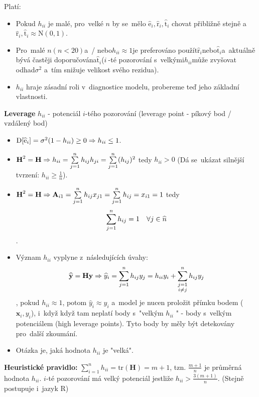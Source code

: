 \begin{remark}
Platí:
\begin{itemize}
\item Pokud $h_{ii}$ je malé, pro~velké $n$ by se~mělo $\widehat{\text{e}}_i, \widehat{\text{r}}_i, \widehat{\mathrm{t}}_i$ chovat přibližně stejně a~$\widehat{\text{r}}_i,\widehat{\mathrm{t}}_i \approx \text{N} (0, 1)$.
\item Pro~malé $n$$ (n < 20) $a~/ nebo$ h_{ii} \approx 1 $je preferováno použít$ \widehat{\text{r}}_i $nebo$ \widehat{\mathrm{t}}_i $a~aktuálně bývá častěji doporučována$ \widehat{\mathrm{t}}_i $($ i~$-té pozorování s~velkými$ h_{ii} $může zvyšovat odhad$ \sigma^2 $ a~tím snižuje velikost svého rezidua).
\item $h_{ii}$ hraje zásadní roli v~diagnostice modelu, probereme teď jeho základní vlastnosti.
\end{itemize}
\end{remark}

\textbf{Leverage} $h_{ii}$ - potenciál $i$-tého pozorování (leverage point - píkový bod / vzdálený bod)

\begin{itemize}
\item $\mathrm{D} [\widehat{\text{e}}_i] = \sigma^2 (1 - h_{ii}) \geq 0 \Rightarrow h_{ii} \leq 1$.
\item $\textbf{H}^2 = \textbf{H} \Rightarrow h_{ii} = \sum\limits_{j=1}^{n} h_{ij} h_{ji} = \sum\limits_{j=1}^{n} (h_{ij})^2$ tedy $h_{ii} > 0$ (Dá se~ukázat silnější tvrzení: $h_{ii} \geq \frac{1}{n}$).
\item $\textbf{H}^2 = \textbf{H} \Rightarrow \textbf{A}_{i1} = \sum\limits_{j=1}^{n} h_{ij} x_{j1} = \sum\limits_{j=1}^{n} h_{ij} = x_{i1} = 1$ tedy
 $$ \sum\limits_{j=1}^{n} h_{ij} = 1 \quad \forall j \in \widehat{n} $$.
\item Význam $h_{ii}$ vyplyne z~následujících úvahy:
 $$
 \widehat{\textbf{y}} = \textbf{Hy} \Rightarrow \widehat{y}_i = \sum\limits_{j=1}^{n} h_{ij}y_j = h_{ii} y_i + \sum\limits_{\substack{j = 1 \\ i\neq j}}^n h_{ij} y_j
 $$
, pokud $h_{ii} \approx 1$, potom $\widehat{y}_i \approx y_i$ a~model je nucen proložit přímku bodem ($\textbf{x}_i, y_i$), i~když když tam neplatí body s~"velkým $h_{ii}$ " - body s~velkým potenciálem (high leverage points). Tyto body by měly být detekovány pro~další zkoumání.
 \item Otázka je, jaká hodnota $h_{ii}$ je "velká".
\end{itemize}
\textbf{Heuristické pravidlo:}
 $\sum_{i = 1}^n h_{ii} = \text{tr}(\textbf{H}) = m + 1$, tzn. $\frac{m+1}{n}$ je průměrná hodnota $h_{ii}$. $i$-té pozorování má velký potenciál jestliže $h_{ii} > \frac{3(m+1)}{n}$. (Stejně postupuje i~jazyk R)

